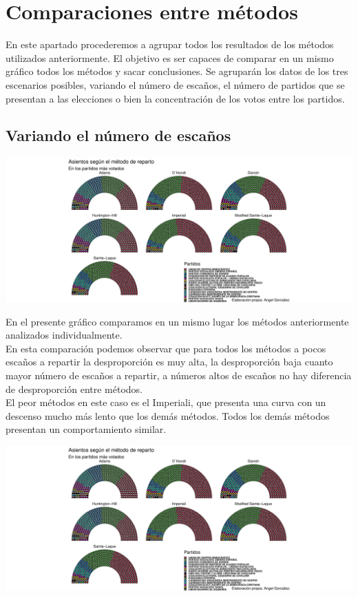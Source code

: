\documentclass[12pt,a4paper,]{book}
\numberwithin{dummy}{section}
\theoremstyle{ocrenumbox}
\theoremstyle{blacknumex}
\theoremstyle{blacknumbox}
\theoremstyle{ocrenum}
\theoremstyle{ocrenum}
\begin{document}
\hypertarget{comparaciones-entre-muxe9todos}{%
\section{Comparaciones entre
métodos}\label{comparaciones-entre-muxe9todos}}

En este apartado procederemos a agrupar todos los resultados de los
métodos utilizados anteriormente. El objetivo es ser capaces de comparar
en un mismo gráfico todos los métodos y sacar conclusiones. Se agruparán
los datos de los tres escenarios posibles, variando el número de
escaños, el número de partidos que se presentan a las elecciones o bien
la concentración de los votos entre los partidos.

\hypertarget{variando-el-nuxfamero-de-escauxf1os}{%
\subsection{Variando el número de
escaños}\label{variando-el-nuxfamero-de-escauxf1os}}

\begin{center}\includegraphics[width=0.95\linewidth]{figurasR/unnamed-chunk-61-1} \end{center}

En el presente gráfico comparamos en un mismo lugar los métodos
anteriormente analizados individualmente.\\
En esta comparación podemos observar que para todos los métodos a pocos
escaños a repartir la desproporción es muy alta, la desproporción baja
cuanto mayor número de escaños a repartir, a números altos de escaños no
hay diferencia de desproporción entre métodos.\\
El peor métodos en este caso es el Imperiali, que presenta una curva con
un descenso mucho más lento que los demás métodos. Todos los demás
métodos presentan un comportamiento similar.

\begin{center}\includegraphics[width=0.95\linewidth]{figurasR/unnamed-chunk-62-1} \end{center}
\end{document}

